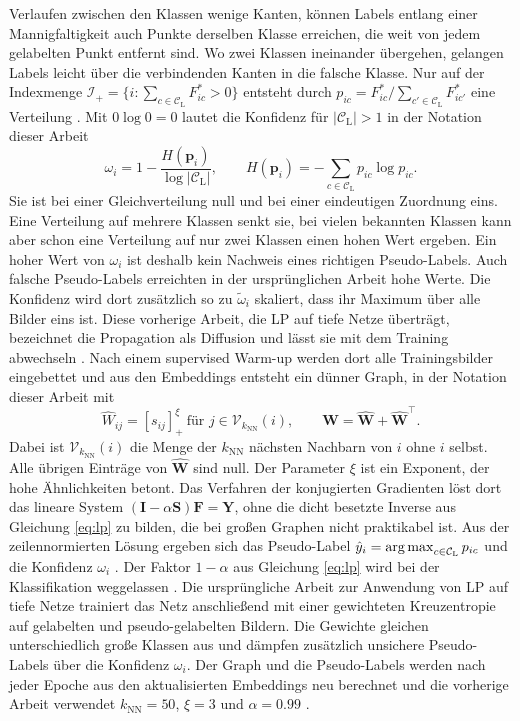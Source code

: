Verlaufen zwischen den Klassen wenige Kanten, können Labels entlang einer Mannigfaltigkeit auch Punkte derselben Klasse erreichen, die weit von jedem gelabelten Punkt entfernt sind. Wo zwei Klassen ineinander übergehen, gelangen Labels leicht über die verbindenden Kanten in die falsche Klasse. Nur auf der Indexmenge $\mathcal{I}_{+}=\{i:\sum_{c\in\mathcal{C}_{\mathrm{L}}}F^{*}_{ic}>0\}$ entsteht durch $p_{ic}=F^{*}_{ic}/\sum_{c'\in\mathcal{C}_{\mathrm{L}}}F^{*}_{ic'}$ eine Verteilung \cite{iscen_label_2019}. Mit $0\log0=0$ lautet die Konfidenz für $|\mathcal{C}_{\mathrm{L}}|>1$ in der Notation dieser Arbeit \cite{iscen_label_2019}
\begin{equation}
  \omega_i=1-\frac{H(\bm{p}_i)}{\log|\mathcal{C}_{\mathrm{L}}|},\qquad H(\bm{p}_i)=-\sum_{c\in\mathcal{C}_{\mathrm{L}}}p_{ic}\log p_{ic}.
  \label{eq:lp-weight}
\end{equation}
Sie ist bei einer Gleichverteilung null und bei einer eindeutigen Zuordnung eins. Eine Verteilung auf mehrere Klassen senkt sie, bei vielen bekannten Klassen kann aber schon eine Verteilung auf nur zwei Klassen einen hohen Wert ergeben. Ein hoher Wert von $\omega_i$ ist deshalb kein Nachweis eines richtigen Pseudo-Labels. Auch falsche Pseudo-Labels erreichten in der ursprünglichen Arbeit hohe Werte. Die Konfidenz wird dort zusätzlich so zu $\tilde\omega_i$ skaliert, dass ihr Maximum über alle Bilder eins ist. Diese vorherige Arbeit, die \acl{LP} auf tiefe Netze überträgt, bezeichnet die Propagation als Diffusion und lässt sie mit dem Training abwechseln \cite{iscen_label_2019}. Nach einem supervised Warm-up werden dort alle Trainingsbilder eingebettet und aus den Embeddings entsteht ein dünner Graph, in der Notation dieser Arbeit mit \cite{iscen_label_2019}
\begin{equation}
  \hat{W}_{ij}=[s_{ij}]_+^{\xi}\ \text{für } j\in\mathcal{V}_{k_{\mathrm{NN}}}(i),\qquad \bm{W}=\hat{\bm{W}}+\hat{\bm{W}}^{\top}.
  \label{eq:lp-graph}
\end{equation}
Dabei ist $\mathcal{V}_{k_{\mathrm{NN}}}(i)$ die Menge der $k_{\mathrm{NN}}$ nächsten Nachbarn von $i$ ohne $i$ selbst. Alle übrigen Einträge von $\hat{\bm{W}}$ sind null. Der Parameter $\xi$ ist ein Exponent, der hohe Ähnlichkeiten betont. Das Verfahren der konjugierten Gradienten löst dort das lineare System $(\bm{I}-\alpha\bm{S})\bm{F}=\bm{Y}$, ohne die dicht besetzte Inverse aus Gleichung \eqref{eq:lp} zu bilden, die bei großen Graphen nicht praktikabel ist. Aus der zeilennormierten Lösung ergeben sich das Pseudo-Label $\hat{y}_i=\operatorname*{arg\,max}_{c\in\mathcal{C}_{\mathrm{L}}}p_{ic}$ und die Konfidenz $\omega_i$ \cite{iscen_label_2019}. Der Faktor $1-\alpha$ aus Gleichung \eqref{eq:lp} wird bei der Klassifikation weggelassen \cite{zhou_learning_2003,iscen_label_2019}. Die ursprüngliche Arbeit zur Anwendung von \ac{LP} auf tiefe Netze trainiert das Netz anschließend mit einer gewichteten Kreuzentropie auf gelabelten und pseudo-gelabelten Bildern. Die Gewichte gleichen unterschiedlich große Klassen aus und dämpfen zusätzlich unsichere Pseudo-Labels über die Konfidenz $\omega_i$. Der Graph und die Pseudo-Labels werden nach jeder Epoche aus den aktualisierten Embeddings neu berechnet und die vorherige Arbeit verwendet $k_{\mathrm{NN}}=50$, $\xi=3$ und $\alpha=\num{0.99}$ \cite{iscen_label_2019}.

